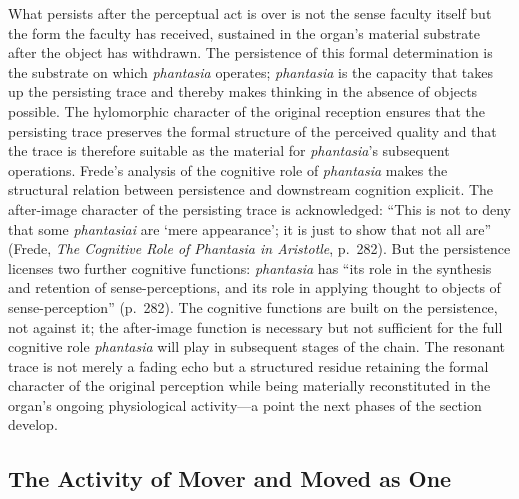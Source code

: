 \documentclass{article}
\begin{document}
What persists after the perceptual act is over is not the sense faculty itself but the form the faculty has received, sustained in the organ's material substrate after the object has withdrawn. The persistence of this formal determination is the substrate on which \textit{phantasia} operates; \textit{phantasia} is the capacity that takes up the persisting trace and thereby makes thinking in the absence of objects possible. The hylomorphic character of the original reception ensures that the persisting trace preserves the formal structure of the perceived quality and that the trace is therefore suitable as the material for \textit{phantasia}'s subsequent operations. Frede's analysis of the cognitive role of \textit{phantasia} makes the structural relation between persistence and downstream cognition explicit. The after-image character of the persisting trace is acknowledged: ``This is not to deny that some \textit{phantasiai} are `mere appearance'; it is just to show that not all are'' (Frede, \textit{The Cognitive Role of Phantasia in Aristotle}, p.~282). But the persistence licenses two further cognitive functions: \textit{phantasia} has ``its role in the synthesis and retention of sense-perceptions, and its role in applying thought to objects of sense-perception'' (p.~282). The cognitive functions are built on the persistence, not against it; the after-image function is necessary but not sufficient for the full cognitive role \textit{phantasia} will play in subsequent stages of the chain. The resonant trace is not merely a fading echo but a structured residue retaining the formal character of the original perception while being materially reconstituted in the organ's ongoing physiological activity---a point the next phases of the section develop.

\subsection{The Activity of Mover and Moved as One}
\end{document}
